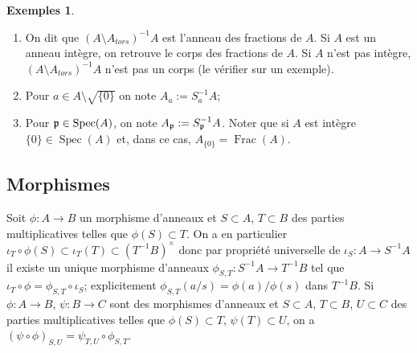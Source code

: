 \documentclass[a4paper, oneside, 12pt]{book}
\theoremstyle{theoremeStyle} %
\theoremstyle{definition} %
\newtheorem{exemples}[theoreme]{Exemples}
\DeclareMathOperator{\Spec}{Spec}
\DeclareMathOperator{\Frac}{Frac}
\begin{document}



\begin{exemples}
	\begin{enumerate}
		\item On dit que $(A\setminus A_{tors})^{-1}A$ est l'anneau des fractions de $A$. Si $A$ est un anneau intègre, on retrouve le corps  des fractions de $A$. Si $A$ n'est pas intègre, $(A\setminus A_{tors})^{-1}A$ n'est pas un corps (le vérifier sur un exemple).
		\item Pour $a\in A\setminus \sqrt{\lbrace 0\rbrace}$ on note $A_a:=S_a^{-1}A $;
		\item Pour $\frak{p}\in \Spec(A)$, on note $A_\frak{p}:=S_{\frak{p}}^{-1}A$. Noter que si $A$ est intègre  $\lbrace 0\rbrace \in \Spec(A)$ et, dans ce cas, $A_{\lbrace 0\rbrace}=\Frac(A)$.
	\end{enumerate}
\end{exemples}

\subsection{Morphismes}
Soit $\phi:A\rightarrow B$ un morphisme d'anneaux et $S\subset A$, $T\subset B$ des parties multiplicatives telles que $\phi(S)\subset T$. On a en particulier $\iota_T\circ \phi(S)\subset \iota_T(T)\subset (T^{-1}B)^\times$ donc par propriété universelle de $\iota_S:A\rightarrow S^{-1}A$ il existe un unique morphisme d'anneaux $\phi_{S,T}:S^{-1}A\rightarrow T^{-1}B$ tel que $\iota_T\circ \phi=\phi_{S,T}\circ \iota_S$; explicitement $\phi_{S,T}(a/s)=\phi(a)/\phi(s)$ dans $T^{-1}B$. Si $\phi:A\rightarrow B$, $\psi:B\rightarrow C$ sont des morphismes d'anneaux et $S\subset A$, $T\subset B$, $U\subset C$ des parties multiplicatives telles que $\phi(S)\subset T$, $\psi(T)\subset U$, on a $(\psi\circ \phi)_{S,U}=\psi_{T,U}\circ \phi_{S,T}$. \\
\end{document}
